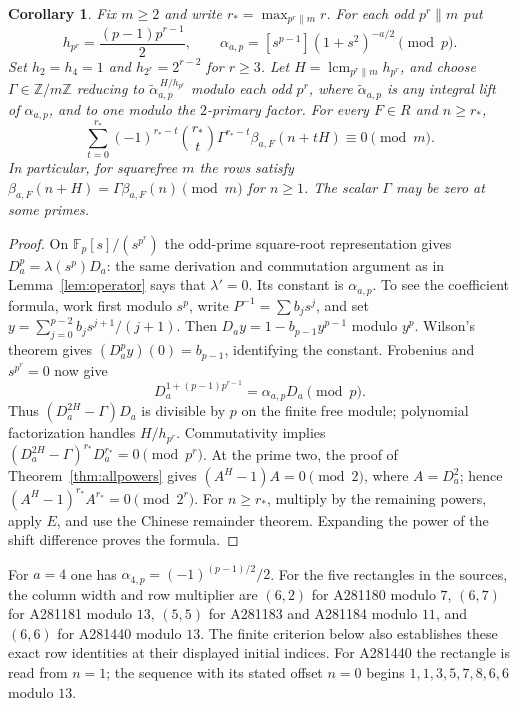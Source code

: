\documentclass[11pt]{article}
\newtheorem{corollary}[theorem]{Corollary}
\newcommand{\Z}{\mathbb Z}
\newcommand{\F}{\mathbb F}
\begin{document}
\begin{corollary}\label{cor:rows}
Fix $m\ge2$ and write $r_* = \max_{p^r\parallel m}r$.
For each odd $p^r\parallel m$ put
\[
 h_{p^r}=\frac{(p-1)p^{r-1}}2,\qquad
 \alpha_{a,p}=[s^{p-1}](1+s^2)^{-a/2}\pmod p.
\]
Set $h_2=h_4=1$ and $h_{2^r}=2^{r-2}$ for $r\ge3$.
Let $H=\operatorname{lcm}_{p^r\parallel m}h_{p^r}$, and choose
$\Gamma\in\Z/m\Z$ reducing to
$\widetilde\alpha_{a,p}^{\,H/h_{p^r}}$ modulo each odd $p^r$,
where $\widetilde\alpha_{a,p}$ is any integral lift of $\alpha_{a,p}$,
and to one modulo the $2$-primary factor.
For every $F\in R$ and $n\ge r_*$,
\[
 \sum_{t=0}^{r_*}(-1)^{r_*-t}\binom{r_*}{t}
 \Gamma^{r_*-t}\beta_{a,F}(n+tH)\equiv0\pmod m.
\]
In particular, for squarefree $m$ the rows satisfy
$\beta_{a,F}(n+H)=\Gamma\beta_{a,F}(n)\pmod m$ for $n\ge1$.
The scalar $\Gamma$ may be zero at some primes.
\end{corollary}
\begin{proof}
On $\F_p[s]/(s^{p^r})$ the odd-prime square-root representation gives
$D_a^p=\lambda(s^p)D_a$: the same derivation and commutation argument
as in Lemma~\ref{lem:operator} says that $\lambda'=0$.
Its constant is $\alpha_{a,p}$. To see the coefficient formula,
work first modulo $s^p$, write $P^{-1}=\sum b_js^j$, and set
$y=\sum_{j=0}^{p-2}b_js^{j+1}/(j+1)$.
Then $D_a y=1-b_{p-1}y^{p-1}$ modulo $y^p$.
Wilson's theorem gives $(D_a^p y)(0)=b_{p-1}$, identifying the constant.
Frobenius and $s^{p^r}=0$ now give
\[
 D_a^{1+(p-1)p^{r-1}}=\alpha_{a,p}D_a\pmod p.
\]
Thus $(D_a^{2H}-\Gamma)D_a$ is divisible by $p$ on the
finite free module; polynomial factorization handles $H/h_{p^r}$.
Commutativity implies
$(D_a^{2H}-\Gamma)^{r_*}D_a^{r_*}=0\pmod{p^r}$.
At the prime two, the proof of Theorem~\ref{thm:allpowers} gives
$(A^H-1)A=0\pmod2$, where $A=D_a^2$;
hence $(A^H-1)^{r_*}A^{r_*}=0\pmod{2^r}$.
For $n\ge r_*$, multiply by the remaining powers, apply $E$,
and use the Chinese remainder theorem. Expanding the power
of the shift difference proves the formula.
\end{proof}

For $a=4$ one has $\alpha_{4,p}=(-1)^{(p-1)/2}/2$.
For the five rectangles in the sources, the column width and row
multiplier are $(6,2)$ for A281180 modulo $7$, $(6,7)$ for A281181
modulo $13$, $(5,5)$ for A281183 and A281184 modulo $11$, and
$(6,6)$ for A281440 modulo $13$. The finite criterion below also
establishes these exact row identities at their displayed initial indices.
For A281440 the rectangle is read from $n=1$; the sequence with
its stated offset $n=0$ begins $1,1,3,5,7,8,6,6$ modulo $13$.
\end{document}
